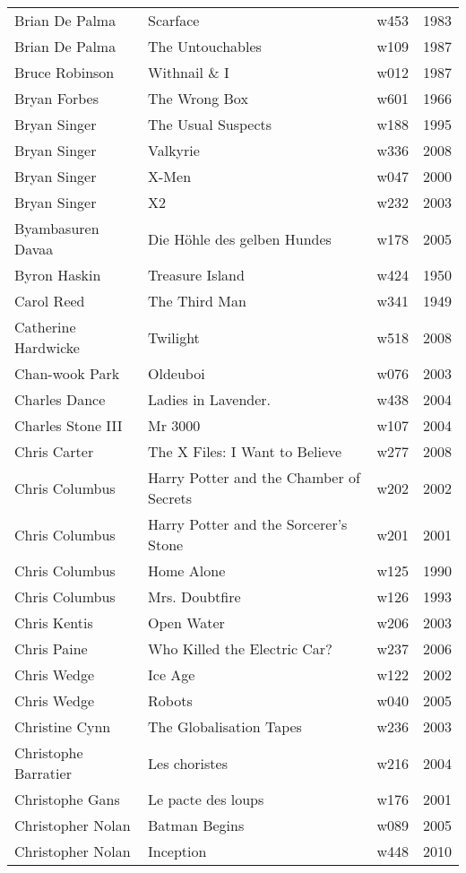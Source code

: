 \documentclass{article}
\begin{document}
\begin {center}
\begin{longtable}{l p{10cm} l l}
Brian De Palma & Scarface & w453 & 1983 \\
Brian De Palma & The Untouchables & w109 & 1987 \\
Bruce Robinson & Withnail \& I & w012 & 1987 \\
Bryan Forbes & The Wrong Box & w601 & 1966 \\
Bryan Singer & The Usual Suspects & w188 & 1995 \\
Bryan Singer & Valkyrie & w336 & 2008 \\
Bryan Singer & X-Men & w047 & 2000 \\
Bryan Singer & X2 & w232 & 2003 \\
Byambasuren Davaa & Die Höhle des gelben Hundes & w178 & 2005 \\
Byron Haskin & Treasure Island & w424 & 1950 \\
Carol Reed & The Third Man & w341 & 1949 \\
Catherine Hardwicke & Twilight & w518 & 2008 \\
Chan-wook Park & Oldeuboi & w076 & 2003 \\
Charles Dance & Ladies in Lavender. & w438 & 2004 \\
Charles Stone III & Mr 3000 & w107 & 2004 \\
Chris Carter & The X Files: I Want to Believe & w277 & 2008 \\
Chris Columbus & Harry Potter and the Chamber of Secrets & w202 & 2002 \\
Chris Columbus & Harry Potter and the Sorcerer's Stone & w201 & 2001 \\
Chris Columbus & Home Alone & w125 & 1990 \\
Chris Columbus & Mrs. Doubtfire & w126 & 1993 \\
Chris Kentis & Open Water & w206 & 2003 \\
Chris Paine & Who Killed the Electric Car? & w237 & 2006 \\
Chris Wedge & Ice Age & w122 & 2002 \\
Chris Wedge & Robots & w040 & 2005 \\
Christine Cynn & The Globalisation Tapes & w236 & 2003 \\
Christophe Barratier & Les choristes & w216 & 2004 \\
Christophe Gans & Le pacte des loups & w176 & 2001 \\
Christopher Nolan & Batman Begins & w089 & 2005 \\
Christopher Nolan & Inception & w448 & 2010 \\

\end{longtable}
\end{center}
\end{document}
